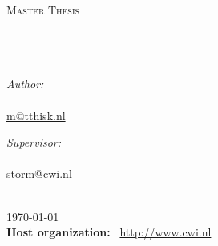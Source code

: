 \documentclass[11pt, oneside]{Thesis} %
\begin{document}
\begin{titlepage}
\begin{center}

\textsc{\Large Master Thesis}\\[0.5cm] %

\HRule \\[0.4cm] %
{\Huge \bfseries \ttitle}\\ %
\HRule \\[1.5cm] %
 
\begin{minipage}{0.4\textwidth}
\begin{flushleft} \large
\emph{Author:}\\
\authornames\\%
\href{m@tthisk.nl}{m@tthisk.nl}
\end{flushleft}
\end{minipage}
\begin{minipage}{0.4\textwidth}
\begin{flushright} \large
\emph{Supervisor:} \\
\supname\\ %
\href{storm@cwi.nl}{storm@cwi.nl}
\end{flushright}
\end{minipage}\\[3cm]
 

{\large \today}\\[4cm] %

\textbf{Host organization:} \host \ \href{http://www.cwi.nl}{http://www.cwi.nl}\\[4cm]



\end{center}
\end{titlepage}
\end{document}
